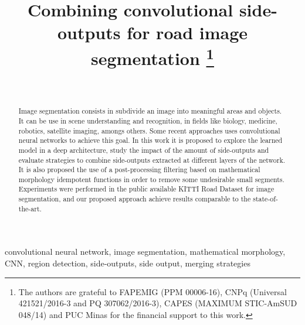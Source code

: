 \documentclass[conference]{IEEEtran}
\begin{document}
\title{Combining convolutional side-outputs for road image segmentation
\thanks{The authors are grateful to FAPEMIG (PPM 00006-16), CNPq (Universal 421521/2016-3 and PQ 307062/2016-3), CAPES (MAXIMUM STIC-AmSUD 048/14) and PUC Minas for the financial support to this work.}
}

\author{
\\
}

\maketitle

\begin{abstract}
Image segmentation consists in subdivide an image into meaningful areas and objects. It can be use in scene understanding and recognition, in fields like biology, medicine, robotics, satellite imaging, amongs others. Some recent approaches uses convolutional neural networks to achieve this goal. In this work it is proposed to explore the learned model in a deep architecture, study the impact of the amount of side-outputs and evaluate strategies to combine side-outputs extracted at different layers of the network. It is also proposed the use of a post-processing filtering based on mathematical morphology idempotent functions in order to remove some undesirable small segments. Experiments were performed in the public available KITTI Road Dataset for image segmentation, and our proposed approach achieve results comparable to the state-of-the-art.
\end{abstract}


\begin{IEEEkeywords}
convolutional neural network, image segmentation, mathematical morphology, CNN, region detection, side-outputs, side output, merging strategies
\end{IEEEkeywords}


%







\end{document}
